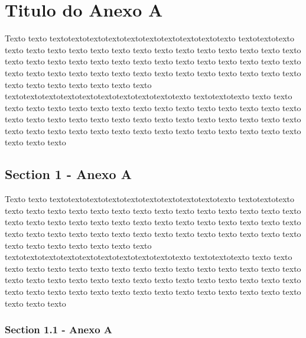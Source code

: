 %
%

\chapter{Titulo do Anexo A}\label{apen:annexA}

Texto texto textotextotextotextotextotextotextotextotextotexto textotextotexto texto texto texto texto texto texto texto texto texto texto texto texto texto texto texto texto texto texto texto texto texto texto texto texto texto texto texto texto texto texto texto texto texto texto texto texto texto texto texto texto texto texto texto texto texto texto texto texto texto textotextotextotextotextotextotextotextotextotexto textotextotexto texto texto texto texto texto texto texto texto texto texto texto texto texto texto texto texto texto texto texto texto texto texto texto texto texto texto texto texto texto texto texto texto texto texto texto texto texto texto texto texto texto texto texto texto texto texto texto 

\section{Section 1 - Anexo A}

Texto texto textotextotextotextotextotextotextotextotextotexto textotextotexto texto texto texto texto texto texto texto texto texto texto texto texto texto texto texto texto texto texto texto texto texto texto texto texto texto texto texto texto texto texto texto texto texto texto texto texto texto texto texto texto texto texto texto texto texto texto texto texto texto textotextotextotextotextotextotextotextotextotexto textotextotexto texto texto texto texto texto texto texto texto texto texto texto texto texto texto texto texto texto texto texto texto texto texto texto texto texto texto texto texto texto texto texto texto texto texto texto texto texto texto texto texto texto texto texto texto texto texto texto 

\subsection{Section 1.1 - Anexo A}

